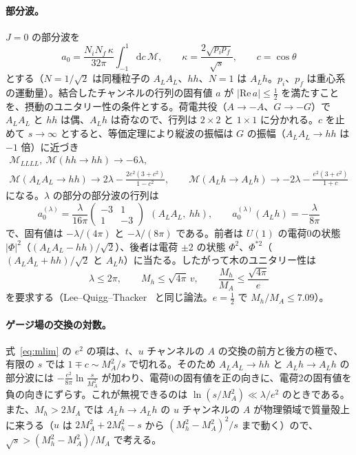 \documentclass[a4paper,10pt]{ltjsarticle}
\newcommand{\dd}{\mathrm{d}}
\newcommand{\re}{\mathrm{Re}\,}
\begin{document}
\paragraph{部分波。}$J=0$ の部分波を
\begin{equation*}
a_0=\frac{N_iN_f\,\kappa}{32\pi}\int_{-1}^1\dd c\,\mathcal M,\qquad \kappa=\frac{2\sqrt{p_ip_f}}{\sqrt s},\qquad c=\cos\theta
\end{equation*}
とする（$N=1/\sqrt2$ は同種粒子の $A_LA_L$、$hh$、$N=1$ は $A_Lh$。$p_i$、$p_f$ は重心系の運動量）。結合したチャンネルの行列の固有値 $a$ が $|\re a|\le\frac12$ を満たすことを、摂動のユニタリー性の条件とする。荷電共役（$A\to-A$、$G\to-G$）で $A_LA_L$ と $hh$ は偶、$A_Lh$ は奇なので、行列は $2\times2$ と $1\times1$ に分かれる。$c$ を止めて $s\to\infty$ とすると、等価定理により縦波の振幅は $G$ の振幅（$A_LA_L\to hh$ は $-1$ 倍）に近づき
\begin{equation}
\begin{gathered}
\mathcal M_{LLLL},\ \mathcal M(hh\to hh)\to-6\lambda,\\
\mathcal M(A_LA_L\to hh)\to2\lambda-\frac{2e^2(3+c^2)}{1-c^2},\qquad
\mathcal M(A_Lh\to A_Lh)\to-2\lambda-\frac{e^2(3+c^2)}{1+c}
\end{gathered}
\label{eq:mlim}
\end{equation}
になる。$\lambda$ の部分の部分波の行列は
\begin{equation}
a_0^{(\lambda)}=\frac\lambda{16\pi}\begin{pmatrix}-3&1\\1&-3\end{pmatrix}\ \ (A_LA_L,\ hh),\qquad a_0^{(\lambda)}(A_Lh)=-\frac\lambda{8\pi}
\label{eq:a0lam}
\end{equation}
で、固有値は $-\lambda/(4\pi)$ と $-\lambda/(8\pi)$ である。前者は $U(1)$ の電荷0の状態 $|\Phi|^2$（$(A_LA_L-hh)/\sqrt2$）、後者は電荷 $\pm2$ の状態 $\Phi^2$、$\Phi^{*2}$（$(A_LA_L+hh)/\sqrt2$ と $A_Lh$）に当たる。したがって木のユニタリー性は
\begin{equation*}
\lambda\le2\pi,\qquad M_h\le\sqrt{4\pi}\,v,\qquad \frac{M_h}{M_A}\le\frac{\sqrt{4\pi}}e
\end{equation*}
を要求する（Lee--Quigg--Thacker~\cite{lqt77} と同じ論法。$e=\frac12$ で $M_h/M_A\le7.09$）。

\paragraph{ゲージ場の交換の対数。}式~\eqref{eq:mlim} の $e^2$ の項は、$t$、$u$ チャンネルの $A$ の交換の前方と後方の極で、有限の $s$ では $1\mp c\sim M_A^2/s$ で切れる。そのため $A_LA_L\to hh$ と $A_Lh\to A_Lh$ の部分波には $-\frac{e^2}{8\pi}\ln\frac s{M_A^2}$ が加わり、電荷0の固有値を正の向きに、電荷2の固有値を負の向きにずらす。これが無視できるのは $\ln(s/M_A^2)\ll\lambda/e^2$ のときである。また、$M_h>2M_A$ では $A_Lh\to A_Lh$ の $u$ チャンネルの $A$ が物理領域で質量殻上に来うる（$u$ は $2M_A^2+2M_h^2-s$ から $(M_h^2-M_A^2)^2/s$ まで動く）ので、$\sqrt s>(M_h^2-M_A^2)/M_A$ で考える。
\end{document}

